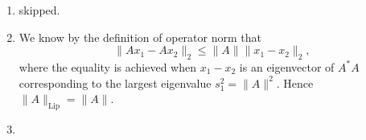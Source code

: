 \documentclass[11pt]{article}
\newcommand{\nm}[1]{\lVert #1 \rVert}
\theoremstyle{plain}
\theoremstyle{definition}
\theoremstyle{remark}
\theoremstyle{definition}
\newenvironment{mansol}[1]{%
  \renewcommand\themansolinner{#1}%
  \mansolinner
}{\endmansolinner}
\begin{document}
\begin{mansol}{5.1.3}
\begin{enumerate}[label=(\alph*)]
\item skipped.
\item We know by the definition of operator norm that \[\nm{Ax_1 - Ax_2}_2 \leq \nm{A}\nm{x_1 - x_2}_2,\] where the equality is achieved when $x_1 - x_2$ is an eigenvector of $A^*A$ corresponding to the largest eigenvalue $s_1^2 = \nm{A}^2$. Hence $\nm{A}_\mathrm{Lip} = \nm{A}$.
\item 
\end{enumerate}
\end{mansol}
\end{document}
